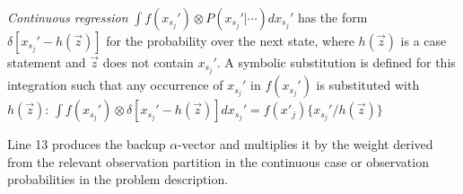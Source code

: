 \documentclass{article} %
\newcommand{\close}{\mathit{close}}
\begin{document}
\emph{Continuous regression} $\int f(x_{s_j}') \otimes P(x_{s_j}'|\cdots) dx_{s_j}'$ has the form $\delta[x_{s_j}' - h(\vec{z})]$ for the probability over the next state, where $h(\vec{z})$ is a case statement and $\vec{z}$ does not contain
$x_{s_j}'$.  A symbolic substitution is defined for this integration such that any occurrence of $x_{s_j}'$ in $f(x_{s_j}')$ is substituted with $h(\vec{z})$: 
$\int f(x_{s_j}') \otimes \delta[x_{s_j}' - h(\vec{z})] dx_{s_j}' = f(x'_j) \{ x_{s_j}' / h(\vec{z}) \}$

Line 13 produces the backup $\alpha$-vector and multiplies it by the weight derived from the relevant observation partition in the continuous case or observation probabilities in the problem description. 
\end{document}
